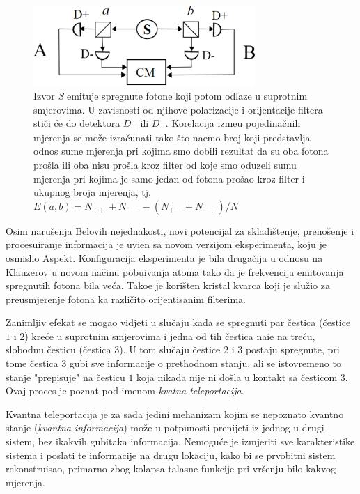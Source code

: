 \begin{figure}
    \centering
    \includegraphics[width=0.75\textwidth]{figures/chsh_scheme.eps}
    \caption{Izvor \textit{S} emituje spregnute fotone koji potom odlaze u suprotnim smjerovima. U zavisnosti od njihove polarizacije i orijentacije filtera sti\'ci \' ce do  detektora $D_+$ ili $D_-$.
    Korelacija izme\dj u pojedina\v cnih mjerenja se mo\v ze izra\v cunati tako \v sto
    na\dj emo broj koji predstavlja odnos sume mjerenja pri kojima smo dobili rezultat da su oba fotona pro\v sla ili oba nisu pro\v sla kroz filter
    od koje smo oduzeli sumu mjerenja pri kojima je samo jedan od fotona pro\v sao kroz filter i ukupnog broja mjerenja, tj.
       $E(a,b) = N_{++} + N_{--} - (N_{+-} + N_{-+})/N$}
    \label{fig:chsh_scheme}
\end{figure}

Osim naru\v senja Belovih nejednakosti, novi potencijal za skladi\v stenje, preno\v senje i procesuiranje informacija je uvi\dj en sa novom verzijom eksperimenta, koju je osmislio Aspekt.
Konfiguracija eksperimenta je bila druga\v cija  u odnosu na Klauzerov u novom na\v cinu pobu\dj ivanja atoma tako da je frekvencija emitovanja
spregnutih fotona bila ve\'ca. Tako\dj e je kori\v sten kristal kvarca koji je slu\v zio za preusmjerenje fotona ka razli\v cito orijentisanim filterima.

Zanimljiv efekat se mogao vidjeti u slu\v caju kada se spregnuti par \v cestica (\v cestice $1$ i $2$) kre\' ce u suprotnim smjerovima i jedna od tih \v cestica nai\dj e na tre\'cu, slobodnu \v cesticu (\v cestica $3$).
U tom slu\v caju \v cestice $2$ i $3$ postaju spregnute, pri tome \v cestica $3$ gubi sve informacije o prethodnom stanju, ali se istovremeno to stanje "prepisuje" na \v cesticu $1$ koja
nikada nije ni do\v sla u kontakt sa \v cesticom $3$. Ovaj proces je poznat pod imenom \textit{kvatna teleportacija}.

Kvantna teleportacija je za sada jedini mehanizam kojim se nepoznato kvantno stanje (\textit{kvantna informacija}) mo\v ze u potpunosti prenijeti iz jednog u drugi sistem,
bez ikakvih gubitaka informacija. Nemogu\'ce je izmjeriti sve karakteristike sistema i poslati te informacije na drugu lokaciju, kako bi se
prvobitni sistem rekonstruisao, primarno zbog kolapsa talasne funkcije pri vr\v senju bilo kakvog mjerenja.

